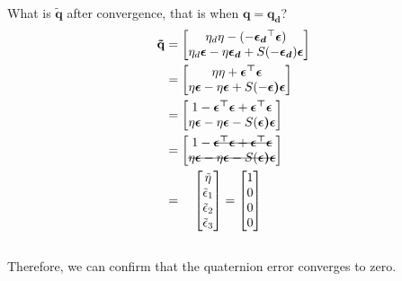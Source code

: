 \\ What is $\mathbf{\tilde q}$ after convergence, that is when $\mathbf{q = q_d}$?
\begin{equation*}
    \begin{align*}
         \mathbf{\tilde q} &= \m{
            \eta_d\eta - (-\boldsymbol{\epsilon_d}^\top \boldsymbol{\epsilon})\\
            \eta_d \boldsymbol{\epsilon} - \eta \boldsymbol{\epsilon_d} + S(-\boldsymbol{\epsilon_d}) \boldsymbol{\epsilon}}\\
        &=
        \m{ \eta\eta + \boldsymbol{\epsilon^\top \epsilon}\\
            \eta\boldsymbol{\epsilon} - \eta\boldsymbol{\epsilon} + S(-\boldsymbol{\epsilon)\epsilon}}\\
        &=
        \m{1 - \boldsymbol{\epsilon^\top\epsilon} + \boldsymbol{\epsilon^\top\epsilon}\\
            \eta\boldsymbol{\epsilon} - \eta\boldsymbol{\epsilon} - S(\boldsymbol{\epsilon)\epsilon}}\\
        &=
        \m{1 - \text{\sout{$\boldsymbol{\epsilon^\top\epsilon} + \boldsymbol{\epsilon^\top\epsilon}$}}\\
            \text{\sout{$\eta\boldsymbol{\epsilon} - \eta\boldsymbol{\epsilon} - S(\boldsymbol{\epsilon)\epsilon}$}} }\\
        &= \quad
        \m{
            \tilde\eta\\
            \tilde\epsilon_1\\
            \tilde\epsilon_2\\
            \tilde\epsilon_3\\}
        =
        \m{
            1\\
            0\\
            0\\
            0\\}
    \end{align*}
\end{equation*} \\
Therefore, we can confirm that the quaternion error converges to zero.